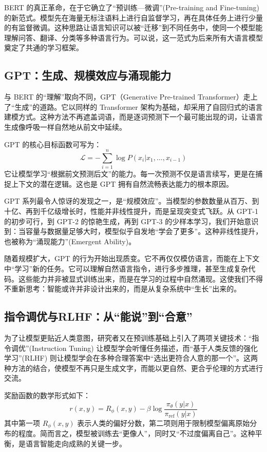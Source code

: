 BERT 的真正革命，在于它确立了“预训练—微调”(Pre-training and Fine-tuning) 的新范式。模型先在海量无标注语料上进行自监督学习，再在具体任务上进行少量的有监督微调。这种思路让语言知识可以被“迁移”到不同任务中，使同一个模型能理解问答、翻译、分类等多种语言行为。可以说，这一范式为后来所有大语言模型奠定了共通的学习框架。

\subsection{GPT：生成、规模效应与涌现能力}

与 BERT 的“理解”取向不同，GPT（Generative Pre-trained Transformer）走上了“生成”的道路。它以同样的 Transformer 架构为基础，却采用了自回归式的语言建模方式。这种方法不再遮盖词语，而是逐词预测下一个最可能出现的词，让语言生成像呼吸一样自然地从前文中延续。

GPT 的核心目标函数可写为：
\[
\mathcal{L} = -\sum_{i=1}^n \log P(x_i | x_1, \ldots, x_{i-1})
\]
它让模型学习“根据前文预测后文”的能力。每一次预测不仅是语言续写，更是在捕捉上下文的潜在逻辑。这也是 GPT 拥有自然流畅表达能力的根本原因。

GPT 系列最令人惊讶的发现之一，是“规模效应”。当模型的参数数量从百万、到十亿、再到千亿级增长时，性能并非线性提升，而是呈现突变式飞跃。从 GPT-1 的初步可行，到 GPT-2 的惊艳生成，再到 GPT-3 的少样本学习，我们开始意识到：当容量与数据量足够大时，模型似乎自发地“学会了更多”。这种非线性提升，也被称为“涌现能力”(Emergent Ability)。

随着规模扩大，GPT 的行为开始出现质变。它不再仅仅模仿语言，而能在上下文中“学习”新的任务。它可以理解自然语言指令，进行多步推理，甚至生成复杂代码。这些能力并非被显式训练出来，而是在学习的过程中自然涌现。这使我们不得不重新思考：智能或许并非设计出来的，而是从复杂系统中“生长”出来的。

\subsection{指令调优与RLHF：从“能说”到“合意”}

为了让模型更贴近人类意图，研究者又在预训练基础上引入了两项关键技术：“指令调优”(Instruction Tuning) 让模型学会听懂任务描述，而“基于人类反馈的强化学习”(RLHF) 则让模型学会在多种合理答案中“选出更符合人意的那一个”。这两种方法的结合，使模型不再只是生成文字，而能以更自然、更合乎伦理的方式进行交流。

奖励函数的数学形式如下：
\[
r(x, y) = R_\phi(x, y) - \beta \log \frac{\pi_\theta(y|x)}{\pi_{\text{ref}}(y|x)}
\]
其中第一项 $R_\phi(x, y)$ 表示人类的偏好分数，第二项则用于限制模型偏离原始分布的程度。简而言之，模型被训练去“更像人”，同时又“不过度偏离自己”。这种平衡，是语言智能走向成熟的关键一步。

